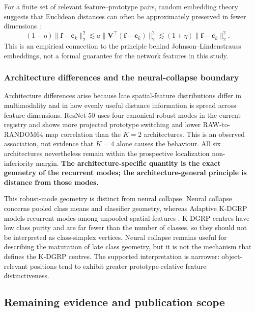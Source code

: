 For a finite set of relevant feature--prototype pairs, random embedding theory
suggests that Euclidean distances can often be approximately preserved in fewer
dimensions \cite{johnson1984extensions}:
\begin{equation}
    (1-\eta)\|\bm f-\bm c_k\|_2^2
    \lesssim
    a\|\bm V^\top(\bm f-\bm c_k)\|_2^2
    \lesssim
    (1+\eta)\|\bm f-\bm c_k\|_2^2.
\end{equation}
This is an empirical connection to the principle behind
Johnson--Lindenstrauss embeddings, not a formal guarantee for the network
features in this study.

\subsubsection{Architecture differences and the neural-collapse boundary}

Architecture differences arise because late spatial-feature distributions
differ in multimodality and in how evenly useful distance information is spread
across feature dimensions. ResNet-50 uses four canonical robust modes in the
current registry and shows more projected prototype switching and lower
RAW-to-RANDOM64 map correlation than the $K=2$ architectures. This is an
observed association, not evidence that $K=4$ alone causes the behaviour.
All six architectures nevertheless remain within the prospective localization
non-inferiority margin. \textbf{The architecture-specific quantity is the exact
geometry of the recurrent modes; the architecture-general principle is distance
from those modes.}

This robust-mode geometry is distinct from neural collapse. Neural collapse
concerns pooled class means and classifier geometry, whereas Adaptive K-DGRP
models recurrent modes among unpooled spatial features
\cite{papyan2020neuralcollapse,zhu2021neuralcollapse,
han2022neuralcollapse,fang2021layerpeeled,kothapalli2023neuralcollapse}.
K-DGRP centres have low class purity and are far fewer than the number of
classes, so they should not be interpreted as class-simplex vertices. Neural
collapse remains useful for describing the maturation of late class geometry,
but it is not the mechanism that defines the K-DGRP centres. The supported
interpretation is narrower: object-relevant positions tend to exhibit greater
prototype-relative feature distinctiveness.

\subsection{Remaining evidence and publication scope}

